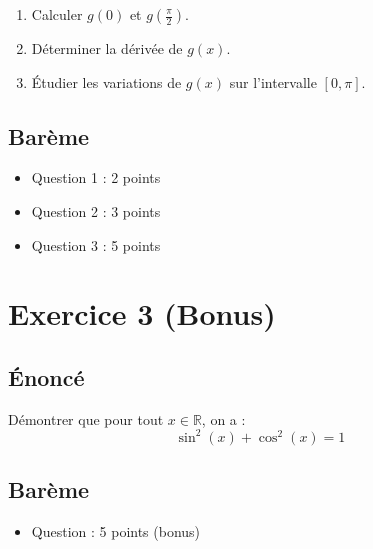 \documentclass[12pt, a4paper]{article}
\begin{document}
\begin{enumerate}
    \item Calculer $g(0)$ et $g(\frac{\pi}{2})$. 
    \item Déterminer la dérivée de $g(x)$. 
    \item Étudier les variations de $g(x)$ sur l'intervalle $[0, \pi]$. 
\end{enumerate}

\subsection*{Barème}
\begin{itemize}
    \item Question 1 : 2 points
    \item Question 2 : 3 points
    \item Question 3 : 5 points
\end{itemize}

\section*{Exercice 3 (Bonus)}
\subsection*{Énoncé}
Démontrer que pour tout $x \in \mathbb{R}$, on a :
\begin{equation*}
    \sin^2(x) + \cos^2(x) = 1
\end{equation*}

\subsection*{Barème}
\begin{itemize}
    \item Question : 5 points (bonus)
\end{itemize}
\end{document}
